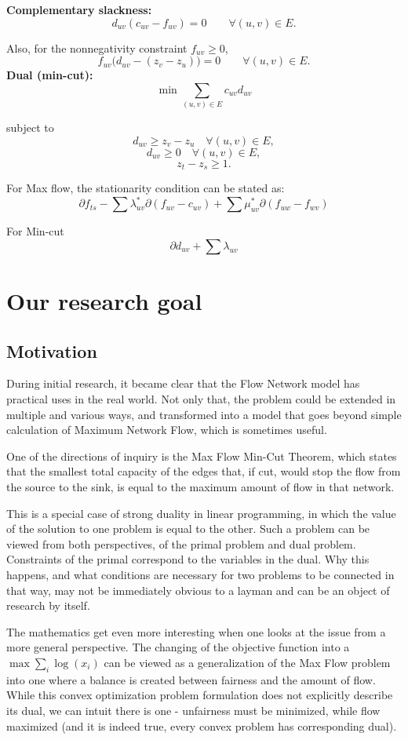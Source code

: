 \documentclass[12pt, openany]{article}
\begin{document}
\textbf{Complementary slackness:}
\[
d_{uv}(c_{uv}-f_{uv})=0
\qquad \forall (u,v)\in E.
\]

Also, for the nonnegativity constraint \(f_{uv}\ge 0\),
\[
f_{uv}\bigl(d_{uv}-(z_v-z_u)\bigr)=0
\qquad \forall (u,v)\in E.
\]
\textbf{Dual (min-cut):}
\[
\min \sum_{(u,v)\in E} c_{uv} d_{uv}
\]

subject to
\[
d_{uv} \ge z_v - z_u \quad \forall (u,v)\in E,
\]
\[
d_{uv} \ge 0 \quad \forall (u,v)\in E,
\]
\[
z_t - z_s \ge 1.
\]

For Max flow, the stationarity condition can be stated as:
\[
\partial f_{ts} -\sum \lambda_{uv}^*\partial (f_{uv} - c_{uv}) +\sum \mu_{uv}^*\partial (f_{uw} - f_{wv})
\]

For Min-cut
\[
\partial d_{uv} + \sum \lambda_{uv}
\]




\section{Our research goal}

\subsection{Motivation}
During initial research, it became clear that the Flow Network model has practical uses in the real world. Not only that, the problem could be extended in multiple and various ways, and transformed into a model that goes beyond simple calculation of Maximum Network Flow, which is sometimes useful.

One of the directions of inquiry is the Max Flow Min-Cut Theorem, which states that the smallest total capacity of the edges that, if cut, would stop the flow from the source to the sink, is equal to the maximum amount of flow in that network.

This is a special case of strong duality in linear programming, in which the value of the solution to one problem is equal to the other. Such a problem can be viewed from both perspectives, of the primal problem and dual problem. Constraints of the primal correspond to the variables in the dual. Why this happens, and what conditions are necessary for two problems to be connected in that way, may not be immediately obvious to a layman and can be an object of research by itself.

The mathematics get even more interesting when one looks at the issue from a more general perspective. The changing of the objective function into a \( \max \sum_{i} \log(x_i) \) can be viewed as a generalization of the Max Flow problem into one where a balance is created between fairness and the amount of flow. While this convex optimization problem formulation does not explicitly describe its dual, we can intuit there is one - unfairness must be minimized, while flow maximized (and it is indeed true, every convex problem has corresponding dual).
\end{document}
